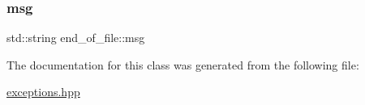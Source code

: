 \subsubsection{\texorpdfstring{msg}{msg}}
{\footnotesize\ttfamily std\+::string end\+\_\+of\+\_\+file\+::msg\hspace{0.3cm}{\ttfamily [private]}}



The documentation for this class was generated from the following file\+:\begin{DoxyCompactItemize}
\item 
\hyperlink{exceptions_8hpp}{exceptions.\+hpp}\end{DoxyCompactItemize}
